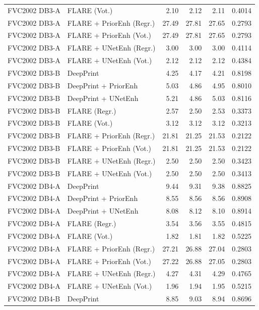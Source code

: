 {\begin{longtable}{llrrrr}
FVC2002 DB3-A & FLARE (Vot.) & 2.10 & 2.12 & 2.11 & 0.4014 \\
FVC2002 DB3-A & FLARE + PriorEnh (Regr.) & 27.49 & 27.81 & 27.65 & 0.2793 \\
FVC2002 DB3-A & FLARE + PriorEnh (Vot.) & 27.49 & 27.81 & 27.65 & 0.2793 \\
FVC2002 DB3-A & FLARE + UNetEnh (Regr.) & 3.00 & 3.00 & 3.00 & 0.4114 \\
FVC2002 DB3-A & FLARE + UNetEnh (Vot.) & 2.12 & 2.12 & 2.12 & 0.4384 \\
\midrule
FVC2002 DB3-B & DeepPrint & 4.25 & 4.17 & 4.21 & 0.8198 \\
FVC2002 DB3-B & DeepPrint + PriorEnh & 5.03 & 4.86 & 4.95 & 0.8010 \\
FVC2002 DB3-B & DeepPrint + UNetEnh & 5.21 & 4.86 & 5.03 & 0.8116 \\
FVC2002 DB3-B & FLARE (Regr.) & 2.57 & 2.50 & 2.53 & 0.3373 \\
FVC2002 DB3-B & FLARE (Vot.) & 3.12 & 3.12 & 3.12 & 0.3213 \\
FVC2002 DB3-B & FLARE + PriorEnh (Regr.) & 21.81 & 21.25 & 21.53 & 0.2122 \\
FVC2002 DB3-B & FLARE + PriorEnh (Vot.) & 21.81 & 21.25 & 21.53 & 0.2122 \\
FVC2002 DB3-B & FLARE + UNetEnh (Regr.) & 2.50 & 2.50 & 2.50 & 0.3423 \\
FVC2002 DB3-B & FLARE + UNetEnh (Vot.) & 2.50 & 2.50 & 2.50 & 0.3413 \\
\midrule
FVC2002 DB4-A & DeepPrint & 9.44 & 9.31 & 9.38 & 0.8825 \\
FVC2002 DB4-A & DeepPrint + PriorEnh & 8.55 & 8.56 & 8.56 & 0.8908 \\
FVC2002 DB4-A & DeepPrint + UNetEnh & 8.08 & 8.12 & 8.10 & 0.8914 \\
FVC2002 DB4-A & FLARE (Regr.) & 3.54 & 3.56 & 3.55 & 0.4815 \\
FVC2002 DB4-A & FLARE (Vot.) & 1.82 & 1.81 & 1.82 & 0.5225 \\
FVC2002 DB4-A & FLARE + PriorEnh (Regr.) & 27.21 & 26.88 & 27.04 & 0.2803 \\
FVC2002 DB4-A & FLARE + PriorEnh (Vot.) & 27.22 & 26.88 & 27.05 & 0.2803 \\
FVC2002 DB4-A & FLARE + UNetEnh (Regr.) & 4.27 & 4.31 & 4.29 & 0.4765 \\
FVC2002 DB4-A & FLARE + UNetEnh (Vot.) & 1.96 & 1.94 & 1.95 & 0.5215 \\
\midrule
FVC2002 DB4-B & DeepPrint & 8.85 & 9.03 & 8.94 & 0.8696 \\

\end{longtable}}

